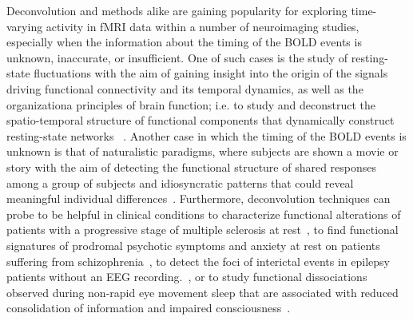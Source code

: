 Deconvolution and methods alike are gaining popularity for exploring time-varying activity in fMRI data within a number of neuroimaging studies, especially when the information about the timing of the BOLD events is unknown, inaccurate, or insufficient. One of such cases is the study of resting-state fluctuations with the aim of gaining insight into the origin of the signals driving functional connectivity and its temporal dynamics, as well as the organizationa principles of brain function; i.e. to study and deconstruct the spatio-temporal structure of functional components that dynamically construct resting-state networks ~\cite{petridou2013PeriodsRestFMRI,karahanoglu2015TransientBrainActivity,karahanoglu2017DynamicsLargescaleFMRI,kinany2020DynamicFunctionalConnectivity,gonzalez-castillo2019ImagingSpontaneousFlow,allan2015FunctionalConnectivityMRI, zamaniesfahlani2020HighamplitudeCofluctuationsCortical}. Another case in which the timing of the BOLD events is unknown is that of naturalistic paradigms, where subjects are shown a movie or story with the aim of detecting the functional structure of shared responses among a group of subjects and idiosyncratic patterns that could reveal meaningful individual differences~\cite{finn2020MoviewatchingOutperformsRest,finn2020IdiosynchronySharedResponses,betzel2020TemporalFluctuationsBrain,faskowitz2020EdgecentricFunctionalNetwork}. Furthermore, deconvolution techniques can probe to be helpful in clinical conditions to characterize functional alterations of patients with a progressive stage of multiple sclerosis at rest~\cite{bommarito2020FunctionalNetworkDynamicsa}, to find functional signatures of prodromal psychotic symptoms and anxiety at rest on patients suffering from schizophrenia~\cite{zoller2019LargeScaleBrainNetwork}, to detect the foci of interictal events in epilepsy patients without an EEG recording.~\cite{lopes2012DetectionEpilepticActivity}, or to study functional dissociations observed during non-rapid eye movement sleep that are associated with reduced consolidation of information and impaired consciousness~\cite{tarun2021NREMSleepStagesa}.

